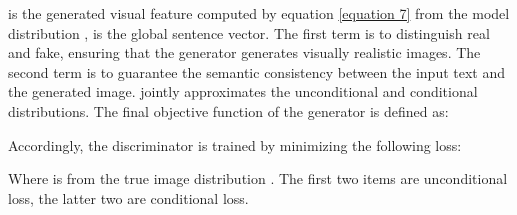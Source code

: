 \documentclass[11pt]{article}
\begin{document}
 is the generated visual feature computed by equation \ref{equation 7} from the model distribution ,  is the global sentence vector. The first term is to distinguish real and fake, ensuring that the generator generates visually realistic images. The second term is to guarantee the semantic consistency between the input text and the generated image.  jointly approximates the unconditional and conditional distributions. The final objective function of the generator is defined as:



Accordingly, the discriminator  is trained by minimizing the following loss:



Where  is from the true image distribution . The first two items are unconditional loss, the latter two are conditional loss.
\end{document}
